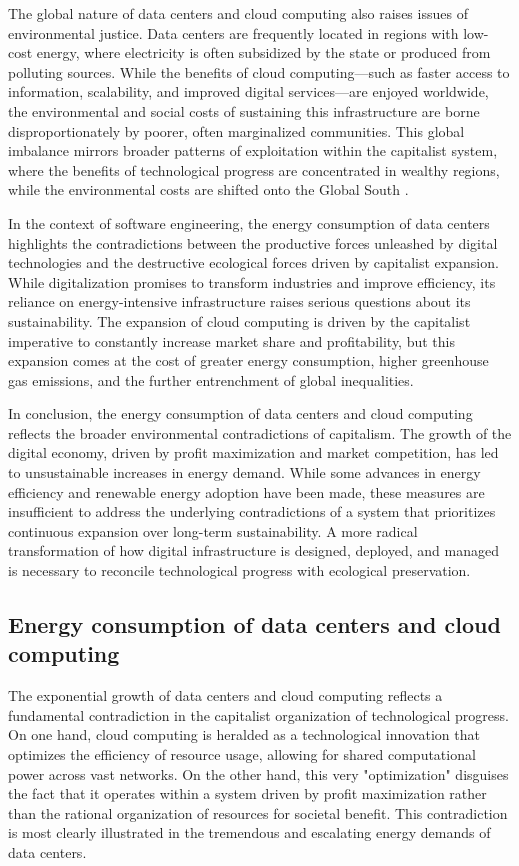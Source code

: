 \begin{refsection}
The global nature of data centers and cloud computing also raises issues of environmental justice. Data centers are frequently located in regions with low-cost energy, where electricity is often subsidized by the state or produced from polluting sources. While the benefits of cloud computing—such as faster access to information, scalability, and improved digital services—are enjoyed worldwide, the environmental and social costs of sustaining this infrastructure are borne disproportionately by poorer, often marginalized communities. This global imbalance mirrors broader patterns of exploitation within the capitalist system, where the benefits of technological progress are concentrated in wealthy regions, while the environmental costs are shifted onto the Global South \cite[pp.~102-104]{fuchs2020}. 

In the context of software engineering, the energy consumption of data centers highlights the contradictions between the productive forces unleashed by digital technologies and the destructive ecological forces driven by capitalist expansion. While digitalization promises to transform industries and improve efficiency, its reliance on energy-intensive infrastructure raises serious questions about its sustainability. The expansion of cloud computing is driven by the capitalist imperative to constantly increase market share and profitability, but this expansion comes at the cost of greater energy consumption, higher greenhouse gas emissions, and the further entrenchment of global inequalities.

In conclusion, the energy consumption of data centers and cloud computing reflects the broader environmental contradictions of capitalism. The growth of the digital economy, driven by profit maximization and market competition, has led to unsustainable increases in energy demand. While some advances in energy efficiency and renewable energy adoption have been made, these measures are insufficient to address the underlying contradictions of a system that prioritizes continuous expansion over long-term sustainability. A more radical transformation of how digital infrastructure is designed, deployed, and managed is necessary to reconcile technological progress with ecological preservation.

\subsection{Energy consumption of data centers and cloud computing}

The exponential growth of data centers and cloud computing reflects a fundamental contradiction in the capitalist organization of technological progress. On one hand, cloud computing is heralded as a technological innovation that optimizes the efficiency of resource usage, allowing for shared computational power across vast networks. On the other hand, this very "optimization" disguises the fact that it operates within a system driven by profit maximization rather than the rational organization of resources for societal benefit. This contradiction is most clearly illustrated in the tremendous and escalating energy demands of data centers.


\end{refsection}
